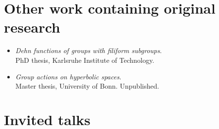\documentclass[a4paper,10pt]{article} %
\begin{document}
\section{Other work containing original research}

\begin{itemize}
    \item \emph{Dehn functions of groups with filiform subgroups}. \\
    PhD thesis, Karlsruhe Institute of Technology. 

    \item \emph{Group actions on hyperbolic spaces}. \\
    Master thesis, University of Bonn. Unpublished. 
\end{itemize}


\section{Invited talks}


\end{document}
